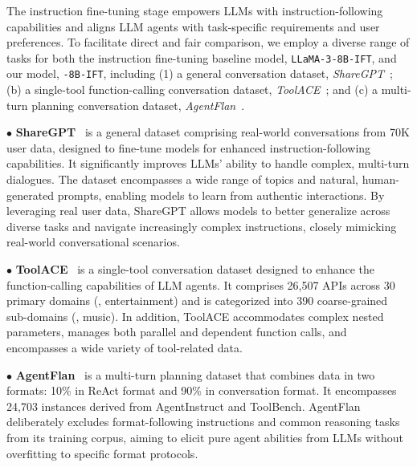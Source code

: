 The instruction fine-tuning stage empowers LLMs with instruction-following capabilities and aligns LLM agents with task-specific requirements and user preferences. To facilitate direct and fair comparison, we employ a diverse range of tasks for both the instruction fine-tuning baseline model, \texttt{LLaMA-3-8B-IFT}, and our model, \texttt{\method-8B-IFT}, including {(1) a general conversation dataset,} \emph{ShareGPT}~\cite{chiang2023vicuna}; {(b) a single-tool function-calling conversation dataset,} \emph{ToolACE}~\cite{liu2024toolace}; and
{(c) a multi-turn planning conversation dataset,} \emph{AgentFlan}~\cite{chen2024agent}.

\noindent $\bullet$ \textbf{ShareGPT}~\cite{chiang2023vicuna} is a general dataset comprising real-world conversations from 70K user data, designed to fine-tune models for enhanced instruction-following capabilities. It significantly improves LLMs' ability to handle complex, multi-turn dialogues. The dataset encompasses a wide range of topics and natural, human-generated prompts, enabling models to learn from authentic interactions. By leveraging real user data, ShareGPT allows models to better generalize across diverse tasks and navigate increasingly complex instructions, closely mimicking real-world conversational scenarios.

\noindent $\bullet$ \textbf{ToolACE}~\cite{liu2024toolace} is a single-tool conversation dataset designed to enhance the function-calling capabilities of LLM agents. It comprises 26,507 APIs across 30 primary domains (\eg, entertainment) and is categorized into 390 coarse-grained sub-domains (\eg, music). In addition, ToolACE accommodates complex nested parameters, manages both parallel and dependent function calls, and encompasses a wide variety of tool-related data.

\noindent $\bullet$ \textbf{AgentFlan}~\cite{chen2024agent} is a multi-turn planning dataset that combines data in two formats: 10\% in ReAct format and 90\% in conversation format. It encompasses 24,703 instances derived from AgentInstruct and ToolBench. AgentFlan deliberately excludes format-following instructions and common reasoning tasks from its training corpus, aiming to elicit pure agent abilities from LLMs without overfitting to specific format protocols.